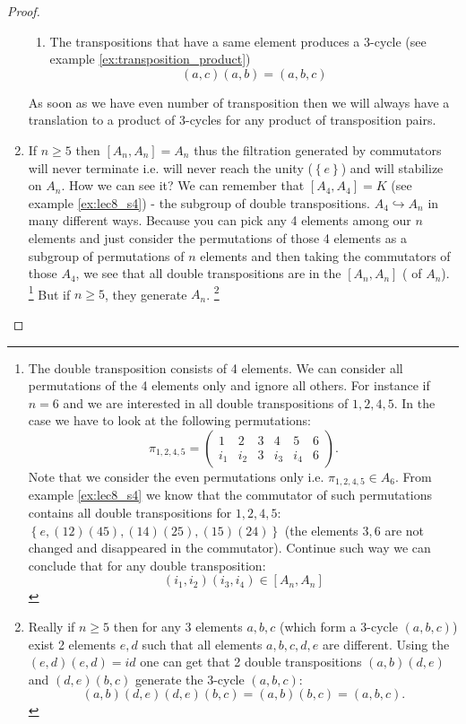 \begin{theorem}[$S_n$ solvability]
\begin{proof}
\begin{enumerate}
{\begin{enumerate}
            \item The transpositions that have a same element produces
              a 3-cycle (see example \ref{ex:transposition_product})
              \[
              (a,c)(a,b) = (a,b,c)
              \]
          \end{enumerate}
          As soon as we have even number of transposition then we will
          always have a translation to a product of 3-cycles for any
          product of transposition pairs.
        }
      \item If $n \ge 5$ then $\left[A_n, A_n\right] = A_n$ thus the
        filtration generated by commutators will never terminate
        i.e. will never reach the unity ($\left\{e\right\}$) and will
        stabilize on $A_n$. How we can see it? We can remember that
        $\left[A_4, A_4\right] = K$ (see example \ref{ex:lec8_s4}) -
        the subgroup of double transpositions. $A_4 \hookrightarrow
        A_n$ in many different ways. Because you can pick any 4
        elements among our $n$ elements and just consider the
        permutations of 
        those 4 elements as a subgroup of permutations of $n$
        elements and then taking the commutators of those $A_4$, we
        see
        that all double transpositions are in the $\left[A_n,
          A_n\right]$ ( of $A_n$).
        \footnote{
          The double transposition consists of 4 elements. We can
          consider all permutations of the 4 elements only and ignore
          all others. For instance if $n = 6$ and we are interested in
          all double transpositions of $1,2,4,5$. In the case we have
          to look at the following permutations:
          \[
          \pi_{1,2,4,5} = \begin{pmatrix}
            1 & 2 & 3 & 4 & 5 & 6\\
            i_1 & i_2 & 3 & i_3 & i_4 & 6
          \end{pmatrix}.
          \]
          Note that we consider the even permutations only i.e.
          $\pi_{1,2,4,5} \in A_6$.
          From example \ref{ex:lec8_s4} we know that the commutator of
          such permutations contains all double transpositions for $1,2,4,5$:  
          $\left\{e, (12)(45), (14)(25), (15)(24) \right\}$ (the
          elements $3,6$ are not changed and disappeared in the
          commutator). Continue such way we can conclude that for any
          double transposition:
          \[
          (i_1,i_2)(i_3,i_4) \in \left[A_n, A_n\right]
          \]
        }
        But
        if $n \ge 5$, they generate $A_n$.
        \footnote{
          Really if $n \ge 5$ then for any 3 elements $a,b,c$ (which form a
          3-cycle $(a,b,c)$) exist 2 elements $e,d$ such that all
          elements $a,b,c,d,e$ are different. Using the
          $(e,d)(e,d) = id$ one can get that 2 double transpositions
          $(a,b)(d,e)$ and $(d,e)(b,c)$ generate the 3-cycle $(a,b,c)$:
          \[
          (a,b)(d,e)(d,e)(b,c) = (a,b)(b,c) = (a,b,c).
          \]

}
\end{enumerate}
\end{proof}
\end{theorem}
